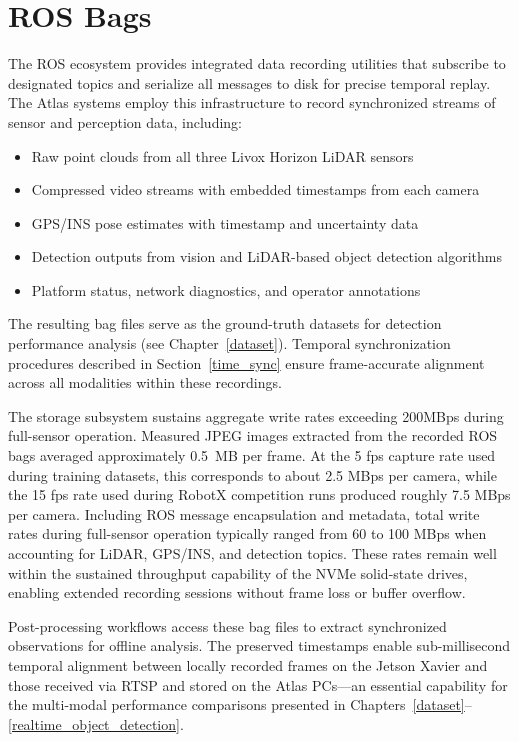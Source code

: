 \documentclass{erauthesis}
\begin{document}
\section{ROS Bags} \label{ROS_bags}

The \ac{ROS} ecosystem provides integrated data recording utilities that subscribe to designated topics and serialize all messages to disk for precise temporal replay.
The Atlas systems employ this infrastructure to record synchronized streams of sensor and perception data, including:

\begin{itemize}
\item Raw point clouds from all three Livox Horizon \ac{LiDAR} sensors
\item Compressed video streams with embedded timestamps from each camera
\item GPS/INS pose estimates with timestamp and uncertainty data
\item Detection outputs from vision and \ac{LiDAR}-based object detection algorithms
\item Platform status, network diagnostics, and operator annotations
\end{itemize}

The resulting bag files serve as the ground-truth datasets for detection performance analysis (see Chapter~\ref{dataset}).
Temporal synchronization procedures described in Section~\ref{time_sync} ensure frame-accurate alignment across all modalities within these recordings.

The storage subsystem sustains aggregate write rates exceeding 200MBps during full-sensor operation.
Measured JPEG images extracted from the recorded ROS bags averaged approximately 0.5~MB per frame.
At the 5 fps capture rate used during training datasets, this corresponds to about 2.5 MBps per camera, while the 15 fps rate used during RobotX competition runs produced roughly 7.5 MBps per camera. 
Including ROS message encapsulation and metadata, total write rates during full-sensor operation typically ranged from 60 to 100 MBps when accounting for LiDAR, GPS/INS, and detection topics. 
These rates remain well within the sustained throughput capability of the NVMe solid-state drives, enabling extended recording sessions without frame loss or buffer overflow.

Post-processing workflows access these bag files to extract synchronized observations for offline analysis.
The preserved timestamps enable sub-millisecond temporal alignment between locally recorded frames on the Jetson Xavier and those received via RTSP and stored on the Atlas PCs—an essential capability for the multi-modal performance comparisons presented in Chapters~\ref{dataset}–\ref{realtime_object_detection}.
\end{document}
